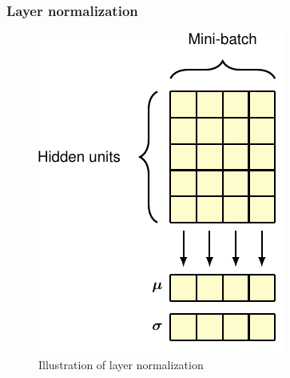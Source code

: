 \documentclass{beamer}
\begin{document}
\begin{frame}
    \frametitle{Layer normalization}
    \begin{figure}
        \caption{Illustration of layer normalization}
        \includegraphics[height=0.6\textheight]{Figure_8_b.pdf}
    \end{figure}
\end{frame}
\end{document}
